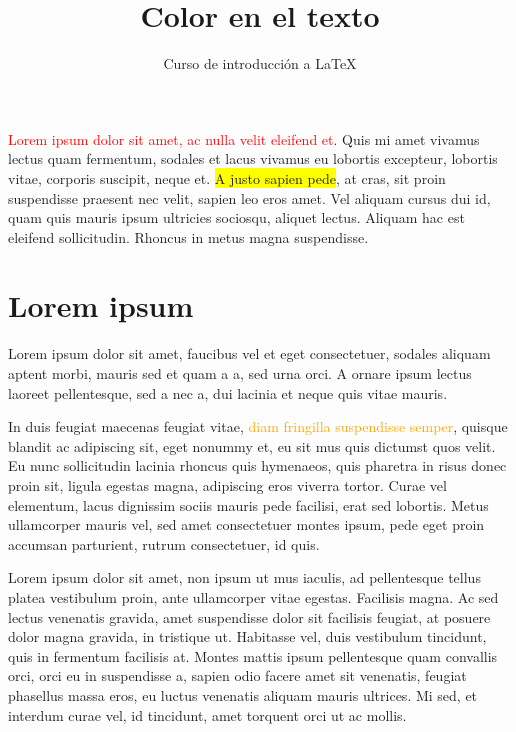 \documentclass[10pt,letterpaper]{article}
\title{Color en el texto}
\author{Curso de introducción a LaTeX}
\begin{document}
\maketitle
\textcolor{red}{Lorem ipsum dolor sit amet, ac nulla velit eleifend et}. Quis mi amet vivamus lectus quam fermentum, sodales et lacus vivamus eu lobortis excepteur, lobortis vitae, corporis suscipit, neque et. \colorbox{yellow}{A justo sapien pede}, at cras, sit proin suspendisse praesent nec velit, sapien leo eros amet. Vel aliquam cursus dui id, quam quis mauris ipsum ultricies sociosqu, aliquet lectus. Aliquam hac est eleifend sollicitudin. Rhoncus in metus magna suspendisse.
 
\section{\color{orange} Lorem ipsum}
Lorem ipsum dolor sit amet, faucibus vel et eget consectetuer, sodales aliquam aptent morbi, mauris sed et quam a a, sed urna orci. A ornare ipsum lectus laoreet pellentesque, sed a nec a, dui lacinia et neque quis vitae mauris. 
 
 
In duis feugiat maecenas feugiat vitae, \textcolor{orange}{diam fringilla suspendisse semper}, quisque blandit ac adipiscing sit, eget nonummy et, eu sit mus quis dictumst quos velit. Eu nunc sollicitudin lacinia rhoncus quis hymenaeos, quis pharetra in risus donec proin sit, ligula egestas magna, adipiscing eros viverra tortor. Curae vel elementum, lacus dignissim sociis mauris pede facilisi, erat sed lobortis. Metus ullamcorper mauris vel, sed amet consectetuer montes ipsum, pede eget proin accumsan parturient, rutrum consectetuer, id quis. 
 
\newpage
\pagecolor{gray}
Lorem ipsum dolor sit amet, non ipsum ut mus iaculis, ad pellentesque tellus platea vestibulum proin, ante ullamcorper vitae egestas. Facilisis magna. Ac sed lectus venenatis gravida, amet suspendisse dolor sit facilisis feugiat, at posuere dolor magna gravida, in tristique ut. Habitasse vel, duis vestibulum tincidunt, quis in fermentum facilisis at. Montes mattis ipsum pellentesque quam convallis orci, orci eu in suspendisse a, sapien odio facere amet sit venenatis, feugiat phasellus massa eros, eu luctus venenatis aliquam mauris ultrices. Mi sed, et interdum curae vel, id tincidunt, amet torquent orci ut ac mollis. 
\end{document}
